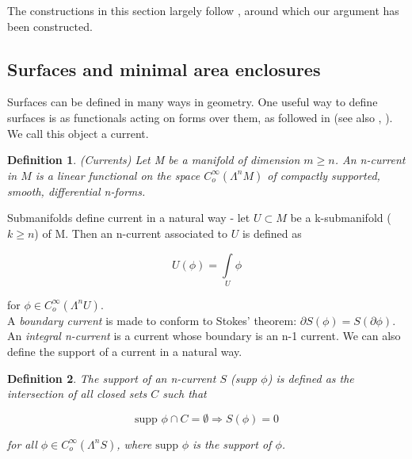 \documentclass{amsart}
\newtheorem{definition}{Definition}
\theoremstyle{named}
\begin{document}

The constructions in this section largely follow \cite{jeff}, around which our argument has been constructed.

\subsection{Surfaces and minimal area enclosures} \label{section: surfaces and mae}

Surfaces can be defined in many ways in geometry. One useful way to define surfaces is as functionals acting on forms over them, as followed in \cite{jeff} (see also \cite{federer1969geometric}, \cite{simon}). We call this object a current. 

\begin{definition}
    (Currents) Let M be a manifold of dimension $m \geq n$. An n-current in $M$ is a linear functional on the space $C_{o}^{\infty}(\Lambda^n M)$ of compactly supported, smooth, differential n-forms. 
\end{definition}

Submanifolds define current in a natural way - let $U \subset M$ be a k-submanifold ($ k \geq n$) of M. Then an n-current associated to $U$ is defined as 

\begin{equation} \nonumber 
    U(\phi) = \int\limits_{U} \phi
\end{equation}

for $\phi \in C_{o}^{\infty}(\Lambda^n U)$. \\

A \textit{boundary current} is made to conform to Stokes' theorem: $\partial S(\phi) = S(\partial \phi)$. An \textit{integral n-current} is a current whose boundary is an n-1 current. We can also define the support of a current in a natural way. 

\begin{definition}

    The support of an n-current $S$ (supp $\phi$) is defined as the intersection of all closed sets $C$ such that 

    \begin{equation*}
        \text{supp } \phi \cap C = \emptyset \Rightarrow S(\phi) = 0
    \end{equation*}

    for all $\phi \in C_{o}^{\infty}(\Lambda^n S)$, where $\text{supp } \phi$ is the support of $\phi$.
    
\end{definition}
\end{document}
